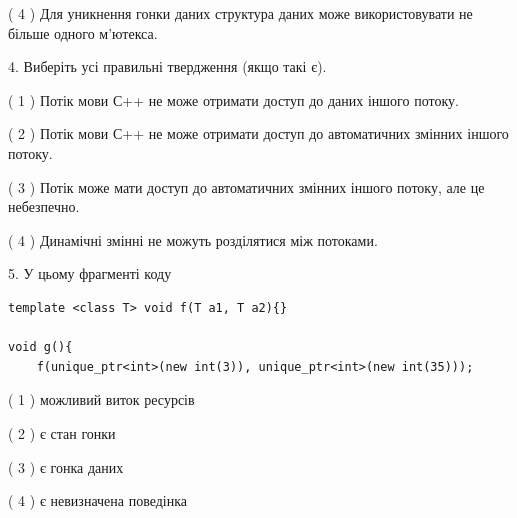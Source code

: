 \documentclass[12pt, ukrainian]{article}
\begin{document}
\begin {large}
{( 4 ) Для уникнення гонки даних структура даних може використовувати не більше одного м’ютекса.%


4. Виберіть усі правильні твердження (якщо такі є).\par
\vspace{2mm}

( 1 ) Потік мови С++ не може отримати доступ до даних іншого потоку.%

( 2 ) Потік мови С++ не може отримати доступ до автоматичних змінних іншого потоку.%

( 3 ) Потік може мати доступ до автоматичних змінних іншого потоку, але це небезпечно.%

( 4 ) Динамічні змінні не можуть розділятися між потоками.%


5. У цьому фрагменті коду
\begin{verbatim}
template <class T> void f(T a1, T a2){}

void g(){
    f(unique_ptr<int>(new int(3)), unique_ptr<int>(new int(35)));
\end{verbatim}

( 1 ) можливий виток ресурсів%

( 2 ) є стан гонки%

( 3 ) є гонка даних%

( 4 ) є невизначена поведінка%
}
\end {large}
\end{document}
